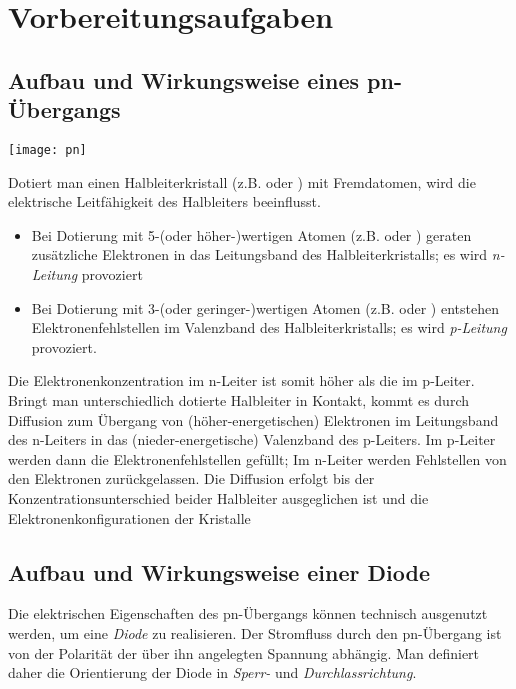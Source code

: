 \documentclass[a4paper, 12pt]{article}
\begin{document}
  
  \clearpage
  \setcounter{page}{1}

\section{Vorbereitungsaufgaben}

\subsection{Aufbau und Wirkungsweise eines pn-Übergangs}
\begin{center}
  \texttt{[image: pn]}
\end{center}

\noindent Dotiert man einen Halbleiterkristall (z.B.  oder ) mit
Fremdatomen, wird die elektrische Leitfähigkeit des Halbleiters beeinflusst.

\begin{itemize}
\item{
    Bei Dotierung mit
    5-(oder höher-)wertigen Atomen (z.B.  oder ) geraten zusätzliche
    Elektronen in das Leitungsband des Halbleiterkristalls; es wird \emph{n-Leitung}
    provoziert
  }

\item{
    Bei Dotierung mit
    3-(oder geringer-)wertigen Atomen (z.B.  oder ) entstehen
    Elektronenfehlstellen im Valenzband des Halbleiterkristalls; es wird \emph{p-Leitung}
    provoziert.
  }
\end{itemize}

Die Elektronenkonzentration im n-Leiter ist somit höher als die im p-Leiter.
Bringt man unterschiedlich dotierte Halbleiter in Kontakt, kommt es durch Diffusion zum Übergang von (höher-energetischen) Elektronen im Leitungsband des n-Leiters in das (nieder-energetische) Valenzband des p-Leiters. Im p-Leiter werden dann die Elektronenfehlstellen gefüllt; Im n-Leiter werden Fehlstellen von den Elektronen zurückgelassen. Die Diffusion erfolgt bis der Konzentrationsunterschied beider Halbleiter ausgeglichen ist und die Elektronenkonfigurationen der Kristalle 


\subsection{Aufbau und Wirkungsweise einer Diode}
Die elektrischen Eigenschaften des pn-Übergangs können technisch ausgenutzt werden, um eine \emph{Diode} zu realisieren. Der Stromfluss durch den pn-Übergang ist von der Polarität der über ihn angelegten Spannung abhängig. Man definiert daher die Orientierung der Diode in \emph{Sperr-} und \emph{Durchlassrichtung}.
\end{document}
